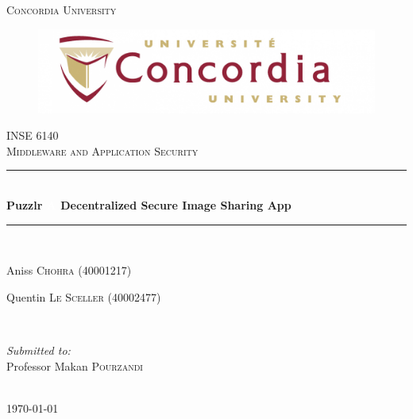 \begin{titlepage}
 \newcommand{\HRule}{\rule{\linewidth}{0.5mm}}
 \center
 
 
 \textsc{\LARGE Concordia University}\\[1.5cm]
 \begin{figure}[h]
 \centering
 \includegraphics[width=12cm]{images/cover/concordia}
 \end{figure}

 \textsc{\large INSE 6140}\\[0.5cm]
 \textsc{\large Middleware and Application Security}
 
 
 \HRule \\[0.4cm]
 {
  \Huge \bfseries  Puzzlr \linebreak
  \Huge \textcolor{white}{A} \LARGE  Decentralized Secure Image Sharing App
 }
 \HRule \\[1.5cm]
 
 
 \begin{minipage}{1\textwidth}
  \begin{flushleft}
   \center Aniss \textsc{Chohra} (40001217)
  \end{flushleft}
  \begin{flushleft}
   \center Quentin \textsc{Le Sceller} (40002477)
  \end{flushleft}


 \end{minipage}
 ~
 \newline
 \newline
 
 
 \begin{minipage}{1\textwidth}
 
  \begin{flushleft}
   \emph{Submitted to:} \\
   Professor Makan \textsc{Pourzandi}
  \end{flushleft}

 \end{minipage}\\[4cm]
 
 
 {\large \today}\\[3cm]
 
 \vfill


\end{titlepage}
